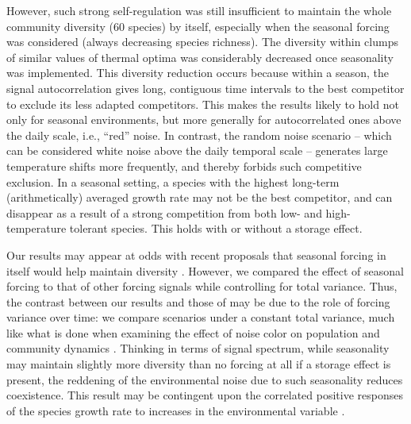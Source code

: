 \documentclass[a4paper,12pt]{article}
\begin{document}
However, such strong self-regulation was still insufficient to maintain
the whole community diversity (60 species) by itself, especially when
the seasonal forcing was considered (always decreasing species richness).
The diversity within clumps of similar values of thermal optima was
considerably decreased once seasonality was implemented. This diversity
reduction occurs because within a season, the signal autocorrelation
gives long, contiguous time intervals to the best competitor to exclude
its less adapted competitors. This makes the results likely to hold
not only for seasonal environments, but more generally for autocorrelated
ones above the daily scale, i.e., ``red'' noise. In contrast, the
random noise scenario -- which can be considered white noise above
the daily temporal scale -- generates large temperature shifts more
frequently, and thereby forbids such competitive exclusion. In a seasonal
setting, a species with the highest long-term (arithmetically) averaged
growth rate may not be the best competitor, and can disappear as a
result of a strong competition from both low- and high-temperature
tolerant species. This holds with or without a storage effect.

Our results may appear at odds with recent proposals that seasonal
forcing in itself would help maintain diversity \citep{sakavara_lumpy_2018}.
However, we compared the effect of seasonal forcing to that of other
forcing signals while controlling for total variance. Thus, the contrast
between our results and those of \citet{sakavara_lumpy_2018} may
be due to the role of forcing variance over time: we compare scenarios
under a constant total variance, much like what is done when examining
the effect of noise color on population and community dynamics \citep{jiang_temperature_2007,ruokolainen_ecological_2009}.
Thinking in terms of signal spectrum, while seasonality may maintain
slightly more diversity than no forcing at all if a storage effect
is present, the reddening of the environmental noise due to such seasonality
reduces coexistence. This result may be contingent upon the correlated
positive responses of the species growth rate to increases in the
environmental variable \citep[and references therein]{ruokolainen_ecological_2009}.
\end{document}
